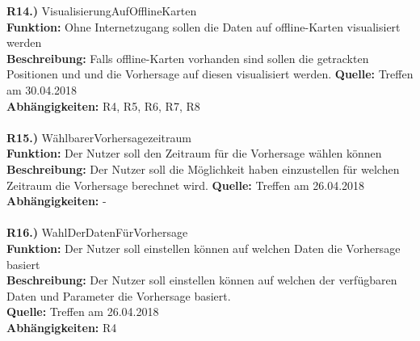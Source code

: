 \documentclass{article}
\begin{document}
	\textbf{R14.)} VisualisierungAufOfflineKarten\\
	\textbf{Funktion:} Ohne Internetzugang sollen die Daten auf offline-Karten visualisiert werden\\
	\textbf{Beschreibung:} Falls offline-Karten vorhanden sind sollen die getrackten Positionen und und die Vorhersage auf diesen visualisiert werden.
	\textbf{Quelle:} Treffen am 30.04.2018\\
	\textbf{Abhängigkeiten:} R4, R5, R6, R7, R8\\\\
	
	\textbf{R15.)} WählbarerVorhersagezeitraum\\
	\textbf{Funktion:} Der Nutzer soll den Zeitraum für die Vorhersage wählen können\\
	\textbf{Beschreibung:} Der Nutzer soll die Möglichkeit haben einzustellen für welchen Zeitraum die Vorhersage berechnet wird.
	\textbf{Quelle:} Treffen am 26.04.2018\\
	\textbf{Abhängigkeiten:} - \\\\
	
	\textbf{R16.)} WahlDerDatenFürVorhersage\\
	\textbf{Funktion:} Der Nutzer soll einstellen können auf welchen Daten die Vorhersage basiert\\
	\textbf{Beschreibung:} Der Nutzer soll einstellen können auf welchen der verfügbaren Daten und Parameter die Vorhersage basiert.\\
	\textbf{Quelle:} Treffen am 26.04.2018\\
	\textbf{Abhängigkeiten:} R4 \\\\
	
\end{document}
